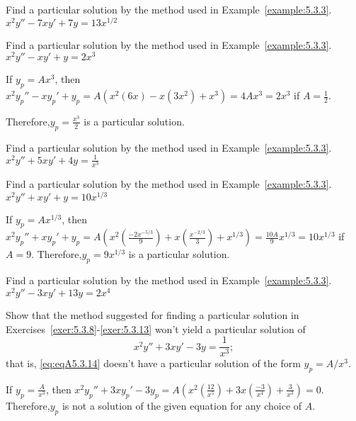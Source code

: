 \documentclass{ximera}
\begin{document}
\begin{problem}\label{exer:5.3.9} Find a
particular solution by the method used in Example~\ref{example:5.3.3}. $x^2y''-7xy'+7y=13x^{1/2}$
\end{problem}

\begin{problem}\label{exer:5.3.10} Find a
particular solution by the method used in Example~\ref{example:5.3.3}. $x^2y''-xy'+y=2x^3$
\begin{solution}
If $y_p=Ax^3$, then  $x^2y_p''-xy_p'+y_p=
A\left(x^2(6x)-x(3x^2)+x^3\right)=4Ax^3=2x^3$ if $A=\frac{1}{2}$.

Therefore,$y_p=\frac{x^3}{2}$ is a particular solution.
\end{solution}
\end{problem}

\begin{problem}\label{exer:5.3.11} Find a
particular solution by the method used in Example~\ref{example:5.3.3}. $x^2y''+5xy'+4y=\frac{1}{x^3}$
\end{problem}

\begin{problem}\label{exer:5.3.12} Find a
particular solution by the method used in Example~\ref{example:5.3.3}. $x^2y''+xy'+y=10x^{1/3}$
\begin{solution}
If $y_p=Ax^{1/3}$, then $x^2y_p''+xy_p'+y_p=
A\left(x^2\left(\frac{-2x^{-5/3}}{9}\right)+x\left(\frac{x^{-2/3}}{3}\right)
+x^{1/3}\right)=\frac{10A}{9}x^{1/3}=10x^{1/3}$
if $A=9$. Therefore,$y_p=9x^{1/3}$ is a particular solution.
\end{solution}
\end{problem}

\begin{problem}\label{exer:5.3.13} Find a
particular solution by the method used in Example~\ref{example:5.3.3}. $x^2y''-3xy'+13y=2x^4$
\end{problem}

\begin{problem}\label{exer:5.3.14}
Show that the method suggested for finding a particular
solution in Exercises~\ref{exer:5.3.8}-\ref{exer:5.3.13}
won't yield a particular solution of \begin{equation}\label{eq:eqA5.3.14}
x^2y''+3xy'-3y=\frac{1}{x^3};
\end{equation}
that is, \ref{eq:eqA5.3.14} doesn't have a particular
solution of the form $y_p=A/x^3$.
\begin{solution}
If $y_p=\frac{A}{x^3}$, then  $x^2y_p''+3xy_p'-3y_p=
A\left(x^2\left(\frac{12}{x^5}\right)+3x\left(\frac{-3}{x^4}\right)
+\frac{3}{x^3}\right)=0$. Therefore,$y_p$ is not a solution of the
given equation for any choice of $A$.
\end{solution}
\end{problem}
\end{document}
